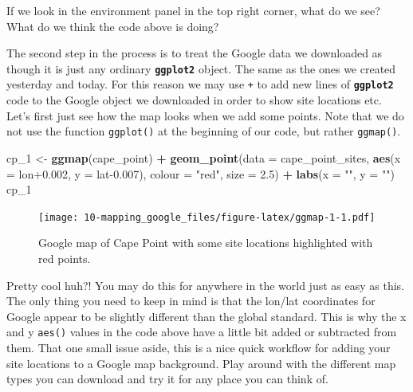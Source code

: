\documentclass[
]{book}
\newenvironment{Shaded}{\begin{snugshade}}{\end{snugshade}}
\newcommand{\DataTypeTok}[1]{\textcolor[rgb]{0.13,0.29,0.53}{#1}}
\newcommand{\DecValTok}[1]{\textcolor[rgb]{0.00,0.00,0.81}{#1}}
\newcommand{\FloatTok}[1]{\textcolor[rgb]{0.00,0.00,0.81}{#1}}
\newcommand{\KeywordTok}[1]{\textcolor[rgb]{0.13,0.29,0.53}{\textbf{#1}}}
\newcommand{\NormalTok}[1]{#1}
\newcommand{\OperatorTok}[1]{\textcolor[rgb]{0.81,0.36,0.00}{\textbf{#1}}}
\newcommand{\StringTok}[1]{\textcolor[rgb]{0.31,0.60,0.02}{#1}}
\begin{document}
If we look in the environment panel in the top right corner, what do we see? What do we think the code above is doing?

The second step in the process is to treat the Google data we downloaded as though it is just any ordinary \textbf{\texttt{ggplot2}} object. The same as the ones we created yesterday and today. For this reason we may use \texttt{+} to add new lines of \textbf{\texttt{ggplot2}} code to the Google object we downloaded in order to show site locations etc. Let's first just see how the map looks when we add some points. Note that we do not use the function \texttt{ggplot()} at the beginning of our code, but rather \texttt{ggmap()}.

\begin{Shaded}
\begin{Highlighting}[]
\NormalTok{cp\_}\DecValTok{1}\NormalTok{ <{-}}\StringTok{ }\KeywordTok{ggmap}\NormalTok{(cape\_point) }\OperatorTok{+}
\StringTok{  }\KeywordTok{geom\_point}\NormalTok{(}\DataTypeTok{data =}\NormalTok{ cape\_point\_sites, }\KeywordTok{aes}\NormalTok{(}\DataTypeTok{x =}\NormalTok{ lon}\FloatTok{+0.002}\NormalTok{, }\DataTypeTok{y =}\NormalTok{ lat}\FloatTok{{-}0.007}\NormalTok{), }
             \DataTypeTok{colour =} \StringTok{"red"}\NormalTok{, }\DataTypeTok{size =}  \FloatTok{2.5}\NormalTok{) }\OperatorTok{+}
\StringTok{  }\KeywordTok{labs}\NormalTok{(}\DataTypeTok{x =} \StringTok{""}\NormalTok{, }\DataTypeTok{y =} \StringTok{""}\NormalTok{)}
\NormalTok{cp\_}\DecValTok{1}
\end{Highlighting}
\end{Shaded}

\begin{figure}
\centering
\texttt{[image: 10-mapping\_google\_files/figure-latex/ggmap-1-1.pdf]}
\caption{\label{fig:ggmap-1}Google map of Cape Point with some site locations highlighted with red points.}
\end{figure}

Pretty cool huh?! You may do this for anywhere in the world just as easy as this. The only thing you need to keep in mind is that the lon/lat coordinates for Google appear to be slightly different than the global standard. This is why the x and y \texttt{aes()} values in the code above have a little bit added or subtracted from them. That one small issue aside, this is a nice quick workflow for adding your site locations to a Google map background. Play around with the different map types you can download and try it for any place you can think of.
\end{document}
